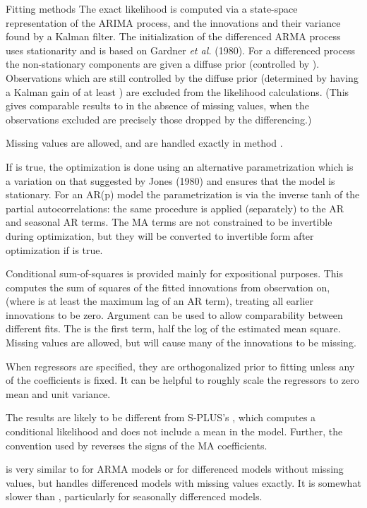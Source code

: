 \begin{Section}{Fitting methods}
The exact likelihood is computed via a state-space representation of
the ARIMA process, and the innovations and their variance found by a
Kalman filter.  The initialization of the differenced ARMA process uses
stationarity and is based on Gardner \emph{et al.} (1980).  For a
differenced process the non-stationary components are given a diffuse
prior (controlled by ).  Observations which are still
controlled by the diffuse prior (determined by having a Kalman gain of
at least ) are excluded from the likelihood calculations.
(This gives comparable results to  in the absence
of missing values, when the observations excluded are precisely those
dropped by the differencing.)

Missing values are allowed, and are handled exactly in method .

If  is true, the optimization is done using an
alternative parametrization which is a variation on that suggested by
Jones (1980) and ensures that the model is stationary.  For an AR(p)
model the parametrization is via the inverse tanh of the partial
autocorrelations: the same procedure is applied (separately) to the
AR and seasonal AR terms.  The MA terms are not constrained to be
invertible during optimization, but they will be converted to
invertible form after optimization if  is true.

Conditional sum-of-squares is provided mainly for expositional
purposes.  This computes the sum of squares of the fitted innovations
from observation  on, (where  is at least
the maximum lag of an AR term), treating all earlier innovations to
be zero.  Argument  can be used to allow comparability
between different fits.  The  is the first
term, half the log of the estimated mean square.  Missing values
are allowed, but will cause many of the innovations to be missing.

When regressors are specified, they are orthogonalized prior to
fitting unless any of the coefficients is fixed.  It can be helpful to
roughly scale the regressors to zero mean and unit variance.
\end{Section}
\begin{Note}\relax
The results are likely to be different from S-PLUS's
, which computes a conditional likelihood and does
not include a mean in the model.  Further, the convention used by
 reverses the signs of the MA coefficients.

 is very similar to  for
ARMA models or for differenced models without missing values,
but handles differenced models with missing values exactly.
It is somewhat slower than , particularly for seasonally
differenced models.
\end{Note}

